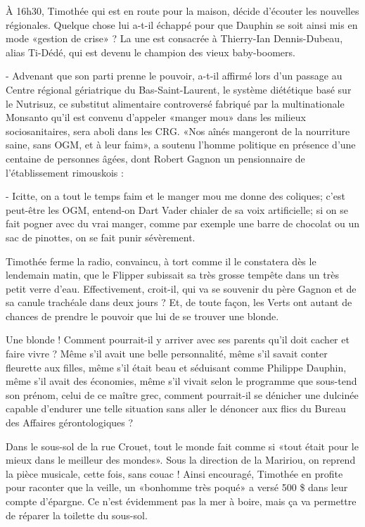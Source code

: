 À 16h30, Timothée qui est en route pour la maison, décide d’écouter les nouvelles régionales. Quelque chose lui a-t-il échappé pour que Dauphin se soit ainsi mis en mode «gestion de crise» ? La une est consacrée à Thierry-Ian Dennis-Dubeau, alias Ti-Dédé, qui est devenu le champion des vieux baby-boomers.

- Advenant que son parti prenne le pouvoir, a-t-il affirmé lors d’un passage au Centre régional gériatrique du Bas-Saint-Laurent, le système diététique basé sur le Nutrisuz, ce substitut alimentaire controversé fabriqué par la multinationale Monsanto qu’il est convenu d’appeler «manger mou» dans les milieux sociosanitaires, sera aboli dans les CRG. «Nos aînés mangeront de la nourriture saine, sans OGM, et à leur faim», a soutenu l’homme politique en présence d’une centaine de personnes âgées, dont Robert Gagnon un pensionnaire de l’établissement rimouskois :

- Icitte, on a tout le temps faim et le manger mou me donne des coliques; c’est peut-être les OGM, entend-on Dart Vader chialer de sa voix artificielle; si on se fait pogner avec du vrai manger, comme par exemple une barre de chocolat ou un sac de pinottes, on se fait punir sévèrement.

Timothée ferme la radio, convaincu, à tort comme il le constatera dès le lendemain matin, que le Flipper subissait sa très grosse tempête dans un très petit verre d’eau. Effectivement, croit-il, qui va se souvenir du père Gagnon et de sa canule trachéale dans deux jours ? Et, de toute façon, les Verts ont autant de chances de prendre le pouvoir que lui de se trouver une blonde.

Une blonde ! Comment pourrait-il y arriver avec ses parents qu’il doit cacher et faire vivre ? Même s’il avait une belle personnalité, même s’il savait conter fleurette aux filles, même s’il était beau et séduisant comme Philippe Dauphin, même s’il avait des économies, même s’il vivait selon le programme que sous-tend son prénom, celui de ce maître grec, comment pourrait-il se dénicher une dulcinée capable d’endurer une telle situation sans aller le dénoncer aux flics du Bureau des Affaires gérontologiques ?

Dans le sous-sol de la rue Crouet, tout le monde fait comme si «tout était pour le mieux dans le meilleur des mondes». Sous la direction de la Maririou, on reprend la pièce musicale, cette fois, sans couac ! Ainsi encouragé, Timothée en profite pour raconter que la veille, un «bonhomme très poqué» a versé 500 \$ dans leur compte d’épargne. Ce n’est évidemment pas la mer à boire, mais ça va permettre de réparer la toilette du sous-sol.


